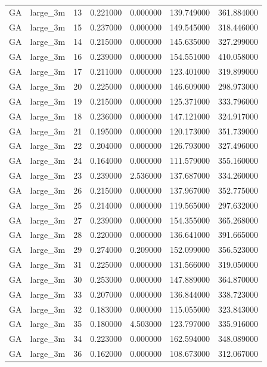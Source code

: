 \begin{tabular}{llrrrrr}
GA & large_3m & 13 & 0.221000 & 0.000000 & 139.749000 & 361.884000 \\
GA & large_3m & 15 & 0.237000 & 0.000000 & 149.545000 & 318.446000 \\
GA & large_3m & 14 & 0.215000 & 0.000000 & 145.635000 & 327.299000 \\
GA & large_3m & 16 & 0.239000 & 0.000000 & 154.551000 & 410.058000 \\
GA & large_3m & 17 & 0.211000 & 0.000000 & 123.401000 & 319.899000 \\
GA & large_3m & 20 & 0.225000 & 0.000000 & 146.609000 & 298.973000 \\
GA & large_3m & 19 & 0.215000 & 0.000000 & 125.371000 & 333.796000 \\
GA & large_3m & 18 & 0.236000 & 0.000000 & 147.121000 & 324.917000 \\
GA & large_3m & 21 & 0.195000 & 0.000000 & 120.173000 & 351.739000 \\
GA & large_3m & 22 & 0.204000 & 0.000000 & 126.793000 & 327.496000 \\
GA & large_3m & 24 & 0.164000 & 0.000000 & 111.579000 & 355.160000 \\
GA & large_3m & 23 & 0.239000 & 2.536000 & 137.687000 & 334.260000 \\
GA & large_3m & 26 & 0.215000 & 0.000000 & 137.967000 & 352.775000 \\
GA & large_3m & 25 & 0.214000 & 0.000000 & 119.565000 & 297.632000 \\
GA & large_3m & 27 & 0.239000 & 0.000000 & 154.355000 & 365.268000 \\
GA & large_3m & 28 & 0.220000 & 0.000000 & 136.641000 & 391.665000 \\
GA & large_3m & 29 & 0.274000 & 0.209000 & 152.099000 & 356.523000 \\
GA & large_3m & 31 & 0.225000 & 0.000000 & 131.566000 & 319.050000 \\
GA & large_3m & 30 & 0.253000 & 0.000000 & 147.889000 & 364.870000 \\
GA & large_3m & 33 & 0.207000 & 0.000000 & 136.844000 & 338.723000 \\
GA & large_3m & 32 & 0.183000 & 0.000000 & 115.055000 & 323.843000 \\
GA & large_3m & 35 & 0.180000 & 4.503000 & 123.797000 & 335.916000 \\
GA & large_3m & 34 & 0.223000 & 0.000000 & 162.594000 & 348.089000 \\
GA & large_3m & 36 & 0.162000 & 0.000000 & 108.673000 & 312.067000 \\

\end{tabular}
